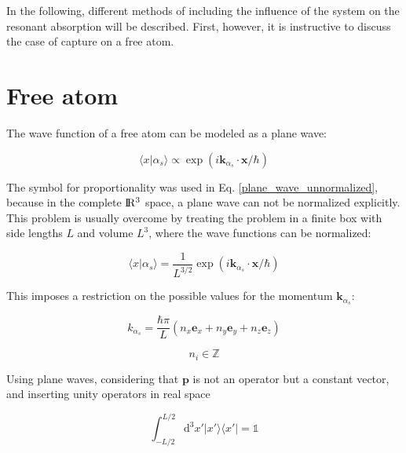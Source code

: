 \documentclass{article}
\begin{document}
In the following, different methods of including the influence of the system on the resonant absorption will be described. First, however, it is instructive to discuss the case of capture on a free atom.

\section{Free atom}
The wave function of a free atom can be modeled as a plane wave:

\begin{equation}
\label{plane_wave_unnormalized}
	\langle x | \alpha_s \rangle \propto \exp{ \left( i \mathbf{k}_{\alpha_s} \cdot \mathbf{x} / \hbar \right) }
\end{equation}

The symbol for proportionality was used in Eq. \ref{plane_wave_unnormalized}, because in the complete $\rm I\!R^3$ space, a plane wave can not be normalized explicitly. 
This problem is usually overcome by treating the problem in a finite box with side lengths $L$ and volume $L^3$, where the wave functions can be normalized:

\begin{equation}
\label{plane_wave_normalized}
	\langle x | \alpha_s \rangle = \frac{1}{L^{ 3/2}} \exp{ \left( i \mathbf{k}_{\alpha_s} \cdot \mathbf{x} / \hbar \right) }
\end{equation}

This imposes a restriction on the possible values for the momentum $\mathbf{k}_{\alpha_s}$:

\begin{equation}
	\label{k_quantization}
	k_{\alpha_s} = \frac{\hbar \pi}{L} \left( n_x \mathbf{e}_x + n_y \mathbf{e}_y + n_z \mathbf{e}_z \right)
\end{equation}

\begin{equation*}
	n_i \in \mathbb{Z}
\end{equation*}

Using plane waves, considering that $\mathbf{p}$ is not an operator but a constant vector, and inserting unity operators in real space

\begin{equation}
	\int_{-L/2}^{L/2} \mathrm{d}^3 x' \left| x' \rangle \langle x' \right| = \mathbb{1}
\end{equation}
\end{document}
